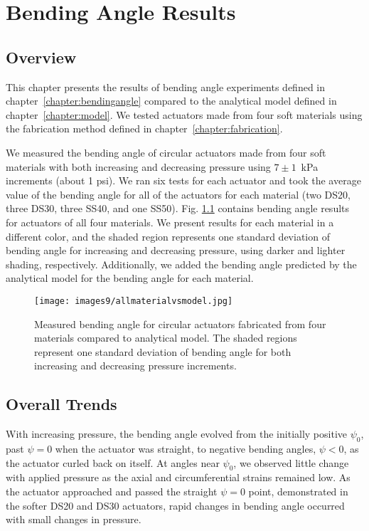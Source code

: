 \chapter{Bending Angle Results}
\label{chapter:angleresults}

\section*{Overview}
This chapter presents the results of bending angle experiments defined in chapter~\ref{chapter:bendingangle} compared to the analytical model defined in chapter~\ref{chapter:model}. We tested actuators made from four soft materials using the fabrication method defined in chapter~\ref{chapter:fabrication}.

We measured the bending angle of circular actuators made from four soft materials with both increasing and decreasing pressure using $7\pm1$~kPa increments (about 1 psi). We ran six tests for each actuator and took the average value of the bending angle for all of the actuators for each material (two DS20, three DS30, three SS40, and one SS50). Fig. \ref{fig:allmaterialvsmodel} contains bending angle results for actuators of all four materials. We present results for each material in a different color, and the shaded region represents one standard deviation of bending angle for increasing and decreasing pressure, using darker and lighter shading, respectively. Additionally, we added the bending angle predicted by the analytical model for the bending angle for each material.

\begin{figure}[ht]
    \centering
     \texttt{[image: images9/allmaterialvsmodel.jpg]}
    \caption{Measured bending angle for circular actuators fabricated from four materials compared to analytical model. The shaded regions represent one standard deviation of bending angle for both increasing and decreasing pressure increments.}
    \label{fig:allmaterialvsmodel}
\end{figure}

\section{Overall Trends}

With increasing pressure, the bending angle evolved from the initially positive $\psi_0$, past $\psi=0$ when the actuator was straight, to negative bending angles, $\psi<0$, as the actuator curled back on itself. At angles near $\psi_0$, we observed little change with applied pressure as the axial and circumferential strains remained low. As the actuator approached and passed the straight $\psi=0$ point, demonstrated in the softer DS20 and DS30 actuators, rapid changes in bending angle occurred with small changes in pressure. 

